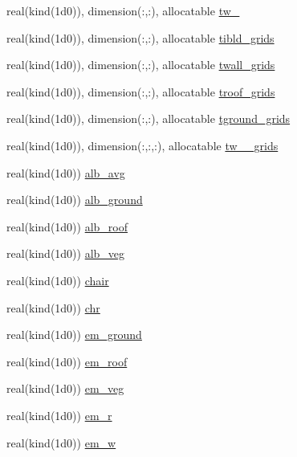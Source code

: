 \begin{DoxyCompactItemize}
\item 
real(kind(1d0)), dimension(\+:,\+:), allocatable \hyperlink{namespaceestm__data_a333d0455fbb31ea62671cae82d2f3da7}{tw\+\_}
\item 
real(kind(1d0)), dimension(\+:,\+:), allocatable \hyperlink{namespaceestm__data_a0779bf7064e6250f2aecbe275a47b0d6}{tibld\+\_\+grids}
\item 
real(kind(1d0)), dimension(\+:,\+:), allocatable \hyperlink{namespaceestm__data_ac581f9c4ab011d112e60e855c575f705}{twall\+\_\+grids}
\item 
real(kind(1d0)), dimension(\+:,\+:), allocatable \hyperlink{namespaceestm__data_aae1edf5139be18aa0eb811a9ccc2985c}{troof\+\_\+grids}
\item 
real(kind(1d0)), dimension(\+:,\+:), allocatable \hyperlink{namespaceestm__data_a2c342d468651c63c5454191631e29c13}{tground\+\_\+grids}
\item 
real(kind(1d0)), dimension(\+:,\+:,\+:), allocatable \hyperlink{namespaceestm__data_a7efa720ab891f65c5700635a46075a0e}{tw\+\_\+\_\+grids}
\item 
real(kind(1d0)) \hyperlink{namespaceestm__data_ae52a19020ba56298fe7780b3ff7b28ff}{alb\+\_\+avg}
\item 
real(kind(1d0)) \hyperlink{namespaceestm__data_a76a61e02b3dd21df95783beee654b5b8}{alb\+\_\+ground}
\item 
real(kind(1d0)) \hyperlink{namespaceestm__data_a3c6b8b304a766dc70d8ca7023dac26ce}{alb\+\_\+roof}
\item 
real(kind(1d0)) \hyperlink{namespaceestm__data_a0c172243ae014ca55f16cdf3fdc0b71e}{alb\+\_\+veg}
\item 
real(kind(1d0)) \hyperlink{namespaceestm__data_aa6d36cc9cf56237cb74ffdce30682dd7}{chair}
\item 
real(kind(1d0)) \hyperlink{namespaceestm__data_a4987b710091708bf51061f8edb66ce63}{chr}
\item 
real(kind(1d0)) \hyperlink{namespaceestm__data_a716c5a370f67397c5e89fdd89af8453d}{em\+\_\+ground}
\item 
real(kind(1d0)) \hyperlink{namespaceestm__data_ae1356a347d79ce36f41977294741499c}{em\+\_\+roof}
\item 
real(kind(1d0)) \hyperlink{namespaceestm__data_acea6bbd39e93113560e4a49945a8aac8}{em\+\_\+veg}
\item 
real(kind(1d0)) \hyperlink{namespaceestm__data_a05f990dc7554e916312b7c01b774956f}{em\+\_\+r}
\item 
real(kind(1d0)) \hyperlink{namespaceestm__data_a603b2198df6b2c26f5aabbec5b04ef72}{em\+\_\+w}

\end{DoxyCompactItemize}

